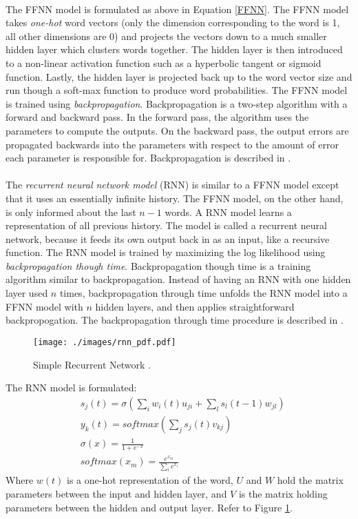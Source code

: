 \paragraph{}
The FFNN model is formulated as above in Equation \ref{FFNN}. The FFNN model takes \emph{one-hot} word vectors (only the dimension corresponding to the word is 1, all other dimensions are 0) and projects the vectors down to a much smaller hidden layer which clusters words together. The hidden layer is then introduced to a non-linear activation function such as a hyperbolic tangent or sigmoid function. Lastly, the hidden layer is projected back up to the word vector size and run though a soft-max function to produce word probabilities. The FFNN model is trained using \emph{backpropagation}. Backpropagation is a two-step algorithm with a forward and backward pass. In the forward pass, the algorithm uses the parameters to compute the outputs. On the backward pass, the output errors are propagated backwards into the parameters with respect to the amount of error each parameter is responsible for. Backpropagation is described in \cite{Bengio2003}.

\paragraph{}
The \emph{recurrent neural network model} (RNN) is similar to a FFNN model except that it uses an essentially infinite history. The FFNN model, on the other hand, is only informed about the last $n-1$ words. A RNN model learns a representation of all previous history. The model is called a recurrent neural network, because it feeds its own output back in as an input, like a recursive function. The RNN model is trained by maximizing the log likelihood using \emph{backpropagation though time}. Backpropagation though time is a training algorithm similar to backpropagation. Instead of having an RNN with one hidden layer used $n$ times, backpropagation through time unfolds the RNN model into a FFNN model with $n$ hidden layers, and then applies straightforward backpropogation. The backpropagation through time procedure is described in \cite{Mikolov2012}.

\begin{figure}
\centering
\texttt{[image: ./images/rnn\_pdf.pdf]}
\caption{Simple Recurrent Network \cite[pg. 34]{Mikolov2012}.}
\label{fig:RNNfigure}
\end{figure}

The RNN model is formulated:
\begin{align}
&s_j(t) = \sigma \left( \sum_i w_i(t) u_{ji} + \sum_l s_l (t-1) w_{jl} \right)
\\
&y_k(t) = softmax \left( \sum_j s_j(t) v_{kj} \right)
\\ 
&\sigma(x) = \frac{1}{1+e^{-x}} \nonumber
\\ 
&softmax(x_m) = \frac{e^{x_m} }{ \sum_i e^{x_i} }  \nonumber
\end{align}
Where $w(t)$ is a one-hot representation of the word, $U$ and $W$ hold the matrix parameters between the input and hidden layer, and $V$ is the matrix holding parameters between the hidden and output layer. Refer to Figure \ref{fig:RNNfigure}.

